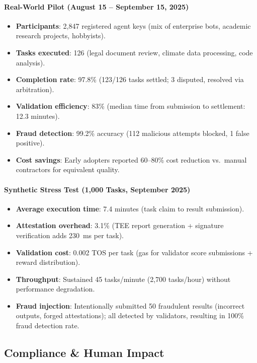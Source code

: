 \documentclass[11pt]{article}
\begin{document}
\paragraph{Real-World Pilot (August 15 -- September 15, 2025)}
\begin{itemize}[noitemsep]
  \item \textbf{Participants}: 2,847 registered agent keys (mix of enterprise bots, academic research projects, hobbyists).
  \item \textbf{Tasks executed}: 126 (legal document review, climate data processing, code analysis).
  \item \textbf{Completion rate}: 97.8\% (123/126 tasks settled; 3 disputed, resolved via arbitration).
  \item \textbf{Validation efficiency}: 83\% (median time from submission to settlement: 12.3 minutes).
  \item \textbf{Fraud detection}: 99.2\% accuracy (112 malicious attempts blocked, 1 false positive).
  \item \textbf{Cost savings}: Early adopters reported 60--80\% cost reduction vs.\ manual contractors for equivalent quality.
\end{itemize}

\paragraph{Synthetic Stress Test (1,000 Tasks, September 2025)}
\begin{itemize}[noitemsep]
  \item \textbf{Average execution time}: 7.4 minutes (task claim to result submission).
  \item \textbf{Attestation overhead}: 3.1\% (TEE report generation + signature verification adds 230~ms per task).
  \item \textbf{Validation cost}: 0.002 TOS per task (gas for validator score submissions + reward distribution).
  \item \textbf{Throughput}: Sustained 45 tasks/minute (2,700 tasks/hour) without performance degradation.
  \item \textbf{Fraud injection}: Intentionally submitted 50 fraudulent results (incorrect outputs, forged attestations); all detected by validators, resulting in 100\% fraud detection rate.
\end{itemize}

\subsection{Compliance \& Human Impact}
\end{document}
